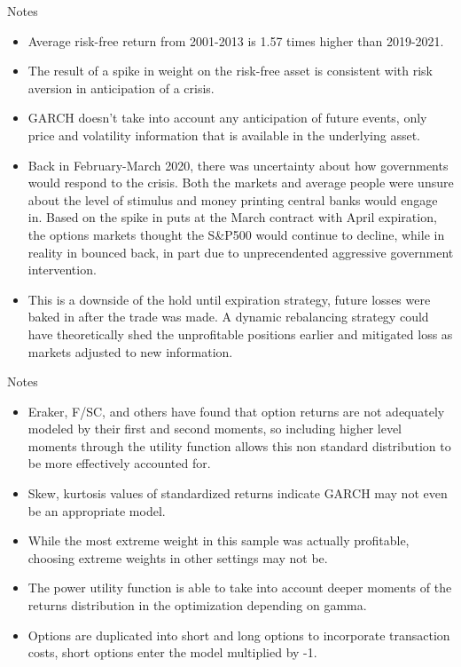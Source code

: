 \documentclass[9pt]{beamer}
\begin{document}
\begin{frame}{Notes}
    \begin{itemize}
        \item Average risk-free return from 2001-2013 is 1.57 times higher than 2019-2021.
        \item The result of a spike in weight on the risk-free asset is consistent with risk aversion in anticipation of a crisis.
        \item GARCH doesn't take into account any anticipation of future events, only price and volatility information that is available in the underlying asset.
        \item Back in February-March 2020, there was uncertainty about how governments would respond to the crisis. Both the markets and average people were unsure about the level of stimulus and money printing central banks would engage in. Based on the spike in puts at the March contract with April expiration, the options markets thought the S\&P500 would continue to decline, while in reality in bounced back, in part due to unprecendented aggressive government intervention.
        \item This is a downside of the hold until expiration strategy, future losses were baked in after the trade was made. A dynamic rebalancing strategy could have theoretically shed the unprofitable positions earlier and mitigated loss as markets adjusted to new information.
    \end{itemize}
\end{frame}

\begin{frame}{Notes}
    \begin{itemize}
        \item Eraker, F/SC, and others have found that option returns are not adequately modeled by their first and second moments, so including higher level moments through the utility function allows this non standard distribution to be more effectively accounted for.
        \item Skew, kurtosis values of standardized returns indicate GARCH may not even be an appropriate model.
        \item While the most extreme weight in this sample was actually profitable, choosing extreme weights in other settings may not be.
        \item The power utility function is able to take into account deeper moments of the returns distribution in the optimization depending on gamma.
        \item Options are duplicated into short and long options to incorporate transaction costs, short options enter the model multiplied by -1.
    \end{itemize}
\end{frame}
\end{document}
